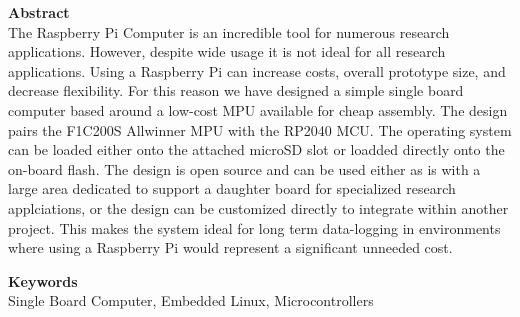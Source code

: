 \textbf{Abstract}\\ 
The Raspberry Pi Computer is an incredible tool for numerous research applications. 
However, despite wide usage it is not ideal for all research applications. 
Using a Raspberry Pi can increase costs, overall prototype size, and decrease flexibility. 
For this reason we have designed a simple single board computer based around a low-cost MPU available for cheap assembly. 
The design pairs the F1C200S Allwinner MPU with the RP2040 MCU. 
The operating system can be loaded either onto the attached microSD slot or loadded directly onto the on-board flash.
The design is open source and can be used either as is with a large area dedicated to support a daughter board for specialized 
research applciations, or the design can be customized directly to integrate within another project. 
This makes the system ideal for long term data-logging in environments where using a Raspberry Pi would represent a significant unneeded cost. 

\textbf{Keywords}\\ Single Board Computer, Embedded Linux, Microcontrollers
